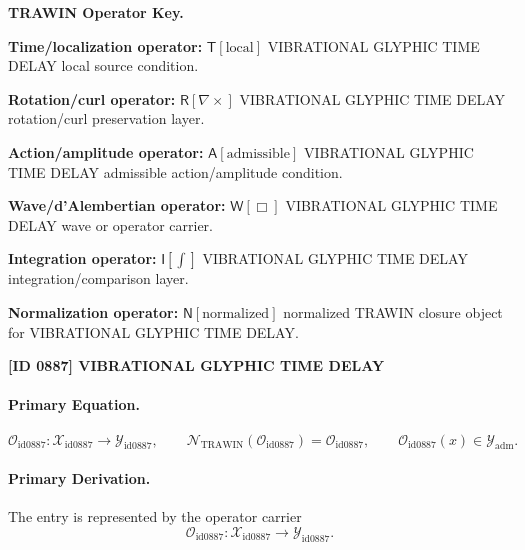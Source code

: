 \par\vspace{0.45\baselineskip}
\noindent\begin{minipage}[t]{\linewidth}
\begingroup
\small
\raggedright
\textbf{TRAWIN Operator Key.}\par
\noindent\textbf{Time/localization operator:} $\mathsf{T}\!\left[\mathrm{local}\right]$ VIBRATIONAL GLYPHIC TIME DELAY local source condition.\par
\noindent\textbf{Rotation/curl operator:} $\mathsf{R}\!\left[\nabla\times\right]$ VIBRATIONAL GLYPHIC TIME DELAY rotation/curl preservation layer.\par
\noindent\textbf{Action/amplitude operator:} $\mathsf{A}\!\left[\mathrm{admissible}\right]$ VIBRATIONAL GLYPHIC TIME DELAY admissible action/amplitude condition.\par
\noindent\textbf{Wave/d'Alembertian operator:} $\mathsf{W}\!\left[\Box\right]$ VIBRATIONAL GLYPHIC TIME DELAY wave or operator carrier.\par
\noindent\textbf{Integration operator:} $\mathsf{I}\!\left[\int\right]$ VIBRATIONAL GLYPHIC TIME DELAY integration/comparison layer.\par
\noindent\textbf{Normalization operator:} $\mathsf{N}\!\left[\mathrm{normalized}\right]$ normalized TRAWIN closure object for VIBRATIONAL GLYPHIC TIME DELAY.\par
\endgroup
\end{minipage}

\clearpage
\noindent\textbf{[ID 0887] VIBRATIONAL GLYPHIC TIME DELAY}\par
\vspace{0.35em}
\paragraph{Primary Equation.}
\[
\mathcal{O}_{\mathrm{id0887}}:\mathcal{X}_{\mathrm{id0887}}\longrightarrow \mathcal{Y}_{\mathrm{id0887}},\qquad
\mathcal{N}_{\mathrm{TRAWIN}}(\mathcal{O}_{\mathrm{id0887}})=\mathcal{O}_{\mathrm{id0887}},\qquad
\mathcal{O}_{\mathrm{id0887}}(x)\in\mathcal{Y}_{\mathrm{adm}}.
\]

\paragraph{Primary Derivation.} The entry is represented by the operator carrier\[
\mathcal{O}_{\mathrm{id0887}}:\mathcal{X}_{\mathrm{id0887}}\longrightarrow \mathcal{Y}_{\mathrm{id0887}}.
\]

